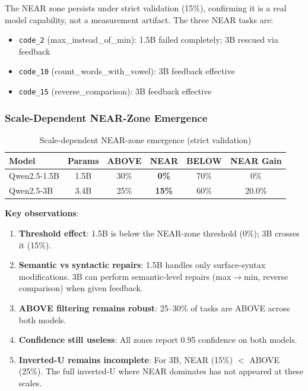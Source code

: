 \documentclass[11pt,a4paper]{article}
\begin{document}
The NEAR zone persists under strict validation (15\%), confirming it is a real model capability, not a measurement artifact. The three NEAR tasks are:
\begin{itemize}
    \item \texttt{code\_2} (max\_instead\_of\_min): 1.5B failed completely; 3B rescued via feedback
    \item \texttt{code\_10} (count\_words\_with\_vowel): 3B feedback effective
    \item \texttt{code\_15} (reverse\_comparison): 3B feedback effective
\end{itemize}

\subsubsection{Scale-Dependent NEAR-Zone Emergence}

\begin{table}[h]
\centering
\begin{tabular}{lccccc}
\toprule
\textbf{Model} & \textbf{Params} & \textbf{ABOVE} & \textbf{NEAR} & \textbf{BELOW} & \textbf{NEAR Gain} \\
\midrule
Qwen2.5-1.5B & 1.5B & 30\% & \textbf{0\%} & 70\% & 0\% \\
Qwen2.5-3B & 3.4B & 25\% & \textbf{15\%} & 60\% & 20.0\% \\
\bottomrule
\end{tabular}
\caption{Scale-dependent NEAR-zone emergence (strict validation)}
\label{tab:scale}
\end{table}

\textbf{Key observations}:
\begin{enumerate}
    \item \textbf{Threshold effect}: 1.5B is below the NEAR-zone threshold (0\%); 3B crosses it (15\%).
    \item \textbf{Semantic vs syntactic repairs}: 1.5B handles only surface-syntax modifications. 3B can perform semantic-level repairs (max$\rightarrow$min, reverse comparison) when given feedback.
    \item \textbf{ABOVE filtering remains robust}: 25--30\% of tasks are ABOVE across both models.
    \item \textbf{Confidence still useless}: All zones report 0.95 confidence on both models.
    \item \textbf{Inverted-U remains incomplete}: For 3B, NEAR (15\%) $<$ ABOVE (25\%). The full inverted-U where NEAR dominates has not appeared at these scales.
\end{enumerate}
\end{document}
